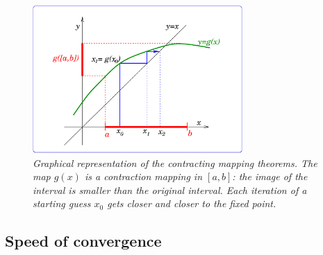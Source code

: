 \begin{figure}
  \centerline{\includegraphics[width=80mm]{figures/contract}}
  \caption{\label{fig:contract} \it Graphical representation of the
    contracting mapping theorems.  The map $g(x)$ is a contraction
    mapping in $[a,b]$: the image of the interval is smaller than the
    original interval.  Each iteration of a starting guess $x_0$ gets
    closer and closer to the fixed point.}
\end{figure}

\subsection{Speed of convergence}

